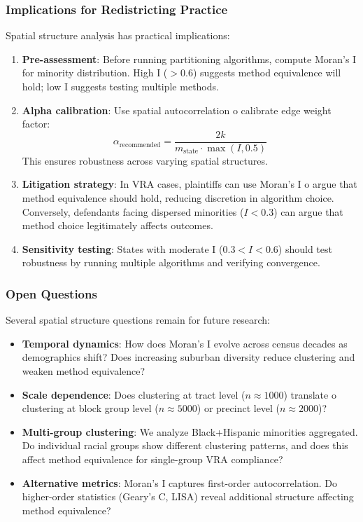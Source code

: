 \subsubsection{Implications for Redistricting Practice}

Spatial structure analysis has practical implications:

\begin{enumerate}
    \item \textbf{Pre-assessment}: Before running partitioning algorithms, compute Moran's I for minority distribution. High I ($> 0.6$) suggests method equivalence will hold; low I suggests testing multiple methods.

    \item \textbf{Alpha calibration}: Use spatial autocorrelation 	o calibrate edge weight factor:
    \[
    \alpha_{\text{recommended}} = \frac{2k}{m_{\text{state}} \cdot \max(I, 0.5)}
    \]
    This ensures robustness across varying spatial structures.

    \item \textbf{Litigation strategy}: In VRA cases, plaintiffs can use Moran's I 	o argue that method equivalence should hold, reducing discretion in algorithm choice. Conversely, defendants facing dispersed minorities ($I < 0.3$) can argue that method choice legitimately affects outcomes.

    \item \textbf{Sensitivity testing}: States with moderate I ($0.3 < I < 0.6$) should test robustness by running multiple algorithms and verifying convergence.
\end{enumerate}

\subsubsection{Open Questions}

Several spatial structure questions remain for future research:

\begin{itemize}
    \item \textbf{Temporal dynamics}: How does Moran's I evolve across census decades as demographics shift? Does increasing suburban diversity reduce clustering and weaken method equivalence?

    \item \textbf{Scale dependence}: Does clustering at tract level ($n \approx 1000$) translate 	o clustering at block group level ($n \approx 5000$) or precinct level ($n \approx 2000$)?

    \item \textbf{Multi-group clustering}: We analyze Black+Hispanic minorities aggregated. Do individual racial groups show different clustering patterns, and does this affect method equivalence for single-group VRA compliance?

    \item \textbf{Alternative metrics}: Moran's I captures first-order autocorrelation. Do higher-order statistics (Geary's C, LISA) reveal additional structure affecting method equivalence?
\end{itemize}

